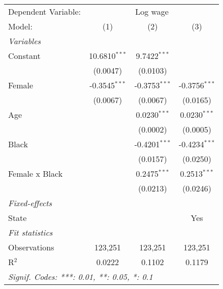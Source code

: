 
\begingroup
\centering
\begin{tabular}{lccc}
   \tabularnewline \midrule \midrule
   Dependent Variable: & \multicolumn{3}{c}{Log wage}\\
   Model:         & (1)             & (2)             & (3)\\  
   \midrule
   \emph{Variables}\\
   Constant       & 10.6810$^{***}$ & 9.7422$^{***}$  &   \\   
                  & (0.0047)        & (0.0103)        &   \\   
   Female         & -0.3545$^{***}$ & -0.3753$^{***}$ & -0.3756$^{***}$\\   
                  & (0.0067)        & (0.0067)        & (0.0165)\\   
   Age            &                 & 0.0230$^{***}$  & 0.0230$^{***}$\\   
                  &                 & (0.0002)        & (0.0005)\\   
   Black          &                 & -0.4201$^{***}$ & -0.4234$^{***}$\\   
                  &                 & (0.0157)        & (0.0250)\\   
   Female x Black &                 & 0.2475$^{***}$  & 0.2513$^{***}$\\   
                  &                 & (0.0213)        & (0.0246)\\   
   \midrule
   \emph{Fixed-effects}\\
   State          &                 &                 & Yes\\  
   \midrule
   \emph{Fit statistics}\\
   Observations   & 123,251         & 123,251         & 123,251\\  
   R$^2$          & 0.0222          & 0.1102          & 0.1179\\  
   \midrule \midrule
   \multicolumn{4}{l}{\emph{Signif. Codes: ***: 0.01, **: 0.05, *: 0.1}}\\
\end{tabular}
\par\endgroup


